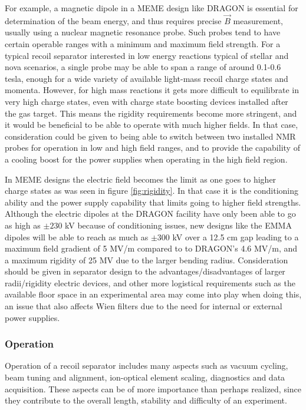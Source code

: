 For example, a magnetic dipole in a MEME design like DRAGON is essential for determination of the beam energy, and thus requires precise $\vec{B}$ measurement, usually using a nuclear magnetic resonance probe.  Such probes tend to have certain operable ranges with a minimum and maximum field strength. For a typical recoil separator interested in low energy reactions typical of stellar and nova scenarios, a single probe may be able to span a range of around 0.1-0.6 tesla, enough for a wide variety of available light-mass recoil charge states and momenta. However, for high mass reactions it gets more difficult to equilibrate in very high charge states, even with charge state boosting devices installed after the gas target. This means the rigidity requirements become more stringent, and it would be beneficial to be able to operate with much higher fields. In that case, consideration could be given to being able to switch between two installed NMR probes for operation in low and high field ranges, and to provide the capability of a cooling boost for the power supplies when operating in the high field region.   

In MEME designs the electric field becomes the limit as one goes to higher charge states as was seen in figure \ref{fig:rigidity}. In that case it is the conditioning ability and the power supply capability that limits going to higher field strengths. Although the electric dipoles at the DRAGON facility have only been able to go as high as $\pm230$ kV because of conditioning issues, new designs like the EMMA dipoles will be able to reach as much as $\pm300$ kV over a 12.5 cm gap \cite{dav05} leading to a maximum field gradient of 5 MV/m compared to to DRAGON's 4.6 MV/m, and a maximum rigidity of 25 MV due to the larger bending radius. Consideration should be given in separator design to the advantages/disadvantages of larger radii/rigidity electric devices, and other more logistical requirements such as the available floor space in an experimental area may come into play when doing this, an issue that also affects Wien filters due to the need for internal or external power supplies. 
 
\subsubsection{Operation}

Operation of a recoil separator includes many aspects such as vacuum cycling, beam tuning and alignment, ion-optical element scaling, diagnostics and data acquisition. These aspects can be of more importance than perhaps realized, since they contribute to the overall length, stability and difficulty of an experiment. 

